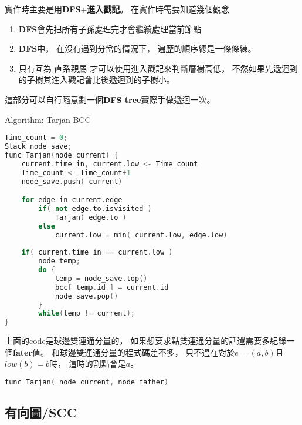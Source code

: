 \documentclass[12pt,oneside]{article}
\begin{document}
實作時主要是用\textbf{DFS}+\textbf{進入戳記}。
在實作時需要知道幾個觀念

\begin{adjustwidth}{2em}{0em}
\begin{enumerate}
    \item 
        \textbf{DFS}會先把所有子孫處理完才會繼續處理當前節點 \label{concept_1}
    \item 
        \textbf{DFS}中，
        在沒有遇到分岔的情況下，
        遍歷的順序總是一條條練。 \label{concept_2}
    \item 
        只有互為{\color{red} 直系親屬} 才可以使用進入戳記來判斷層樹高低，
        不然如果先遞迴到的子樹其進入戳記會比後遞迴到的子樹小。 \label{concept_3}
\end{enumerate}
\end{adjustwidth}

這部分可以自行隨意劃一個\textbf{DFS tree}實際手做遞迴一次。

\vspace*{2em}
\begin{center}
    Algorithm: Tarjan BCC
\end{center}
\begin{lstlisting}[language=C++,escapeinside=``]
Time_count = 0;
Stack node_save;
func Tarjan(node current) {
    current.time_in, current.low <- Time_count
    Time_count <- Time_count+1
    node_save.push( current)

    for edge in current.edge
        if( not edge.to.isvisited )
            Tarjan( edge.to )
        else   
            current.low = min( current.low, edge.low) 
        
    if( current.time_in == current.low ) 
        node temp;
        do {
            temp = node_save.top()
            bcc[ temp.id ] = current.id 
            node_save.pop()
        }
        while(temp != current);
}
\end{lstlisting}
\vspace*{2em}

上面的code是球邊雙連通分量的，
如果想要求點雙連通分量的話還需要多紀錄一個\textbf{fater}值。
和球邊雙連通分量的程式碼差不多，
只不過在對於$e=(a, b)$且$low( b ) = b$時，
這時的割點會是$a$。

\begin{lstlisting}[language=C++,escapeinside=``]
func Tarjan( node current, node father)
\end{lstlisting}

\subsection{有向圖/SCC}
\end{document}
